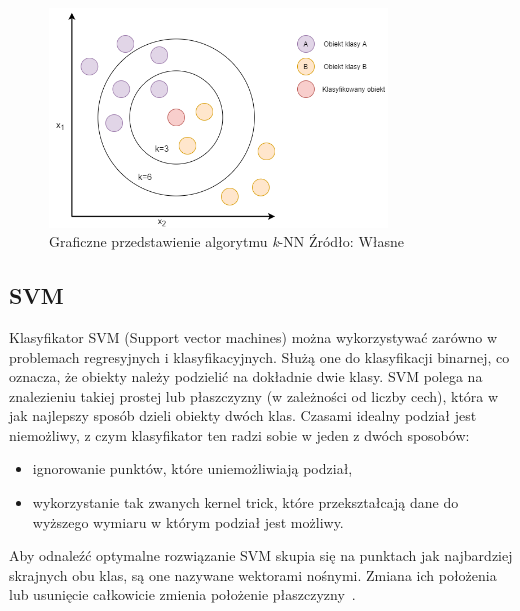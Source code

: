 \begin{figure}[H]
    \centering
    \includegraphics[width=0.8\textwidth]{./Img/KNN.png}
    \caption{Graficzne przedstawienie algorytmu \textit{k}-NN Źródło: Własne}
\end{figure}

\subsection{SVM}

Klasyfikator SVM (Support vector machines) można wykorzystywać zarówno 
w problemach regresyjnych i klasyfikacyjnych. Służą one do klasyfikacji binarnej, co 
oznacza, że obiekty należy podzielić na dokładnie dwie klasy. SVM polega na znalezieniu
takiej prostej lub płaszczyzny (w zależności od liczby cech), która w jak najlepszy sposób
dzieli obiekty dwóch klas. Czasami idealny podział jest niemożliwy, z czym klasyfikator 
ten radzi sobie w jeden z dwóch sposobów:
\begin{itemize}
    \item ignorowanie punktów, które uniemożliwiają podział,
    \item wykorzystanie tak zwanych kernel trick, które przekształcają dane do wyższego 
    wymiaru w którym podział jest możliwy.
\end{itemize}
Aby odnaleźć optymalne rozwiązanie SVM skupia się na punktach jak najbardziej skrajnych
obu klas, są one nazywane wektorami nośnymi. Zmiana ich położenia lub usunięcie
całkowicie zmienia położenie płaszczyzny~\cite{MLAlgorithms}.

